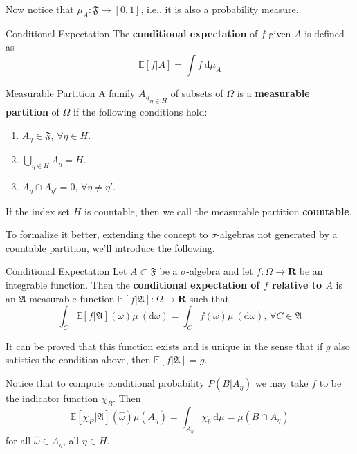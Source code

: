 Now notice that $\mu_A : \mathfrak{F} \longrightarrow [0,1]$, i.e., it is also a probability measure.

\begin{definition}[]{Conditional Expectation}
	The \textbf{conditional expectation} of $f$ given $A$ is defined as 
\[
	\mathbb{E} [f | A] = \int f ~\mathrm{d}\mu_A
\]
\end{definition}

\begin{definition}[]{Measurable Partition}{}
	A family ${A_\eta}_{\eta \in H}$ of subsets of $\Omega$ is a \textbf{measurable partition} of $\Omega$ if the following conditions hold:
	\begin{enumerate}
		\item $A_\eta \in \mathfrak{F}$, $\forall \eta \in H$.
		\item $\bigcup_{\eta \in H} A_\eta = H$.
		\item $A_\eta \cap A_{\eta'} = 0$, $\forall \eta \neq \eta'$.
	\end{enumerate}
	If the index set $H$ is countable, then we call the measurable partition \textbf{countable}.
\end{definition}

To formalize it better, extending the concept to $\sigma$-algebras not generated by a countable partition, we'll introduce the following.

\begin{definition}[]{Conditional Expectation}{}
	Let $A \subset \mathfrak{F}$ be a $\sigma$-algebra and let $f : \Omega \longrightarrow \textbf{R}$ be an integrable function. Then the \textbf{conditional expectation of $f$ relative to $A$} is an $\mathfrak{A}$-measurable function $\mathbb{E}[f | \mathfrak{A}] : \Omega \longrightarrow \textbf{R}$ such that
	\[
		\int_C \mathbb{E}[f | \mathfrak{A}](\omega) \mu ~(\mathrm{d} \omega) = \int_C f(\omega) \mu ~(\mathrm{d} \omega), \, \forall C \in \mathfrak{A}
	\]
\end{definition}

It can be proved that this function exists and is unique in the sense that if $g$ also satisties the condition above, then $\mathbb{E}[f | \mathfrak{A}] = g$.

Notice that to compute conditional probability $P(B | A_\eta)$ we may take $f$ to be the indicator function $\chi_B$. Then
\[
	\mathbb{E}[\chi_B | \mathfrak{A}](\hat{\omega}) \mu(A_\eta) = \int_{A_\eta} \chi_b ~\mathrm{d}\mu = \mu(B \cap A_\eta)
\]
for all $\hat{\omega} \in A_\eta$, all $\eta \in H$.

